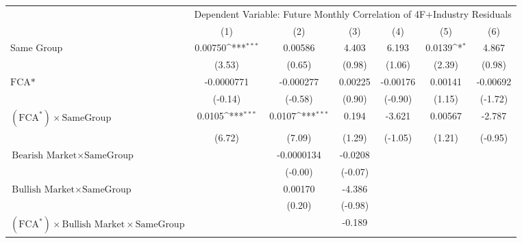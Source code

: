 {
\def\sym#1{\ifmmode^{#1}\else\(^{#1}\)\fi}
\begin{tabular}{l*{6}{c}}
\hline\hline
                &\multicolumn{6}{c}{Dependent Variable: Future Monthly Correlation of 4F+Industry Residuals}                      \\\cmidrule(lr){2-7}
                &\multicolumn{1}{c}{(1)}         &\multicolumn{1}{c}{(2)}         &\multicolumn{1}{c}{(3)}         &\multicolumn{1}{c}{(4)}         &\multicolumn{1}{c}{(5)}         &\multicolumn{1}{c}{(6)}         \\
\hline
Same Group      &  0.00750\sym{***}&  0.00586         &    4.403         &    6.193         &   0.0139\sym{*}  &    4.867         \\
                &   (3.53)         &   (0.65)         &   (0.98)         &   (1.06)         &   (2.39)         &   (0.98)         \\
[1em]
$ \text{FCA*} $ &-0.0000771         &-0.000277         &  0.00225         & -0.00176         &  0.00141         & -0.00692         \\
                &  (-0.14)         &  (-0.58)         &   (0.90)         &  (-0.90)         &   (1.15)         &  (-1.72)         \\
[1em]
 $ (\text{FCA}^*) \times {\text{SameGroup} }  $ &   0.0105\sym{***}&   0.0107\sym{***}&    0.194         &   -3.621         &  0.00567         &   -2.787         \\
                &   (6.72)         &   (7.09)         &   (1.29)         &  (-1.05)         &   (1.21)         &  (-0.95)         \\
[1em]
$ {\text{Bearish Market} } \times {\text{SameGroup} }  $ &                  &-0.0000134         &  -0.0208         &                  &                  &                  \\
                &                  &  (-0.00)         &  (-0.07)         &                  &                  &                  \\
[1em]
$ {\text{Bullish Market} } \times {\text{SameGroup} }  $ &                  &  0.00170         &   -4.386         &                  &                  &                  \\
                &                  &   (0.20)         &  (-0.98)         &                  &                  &                  \\
[1em]
$ (\text{FCA}^*) \times {\text{Bullish Market}} \times {\text{SameGroup} }  $ &                  &                  &   -0.189         &                  &                  &                  \\

\end{tabular}}

